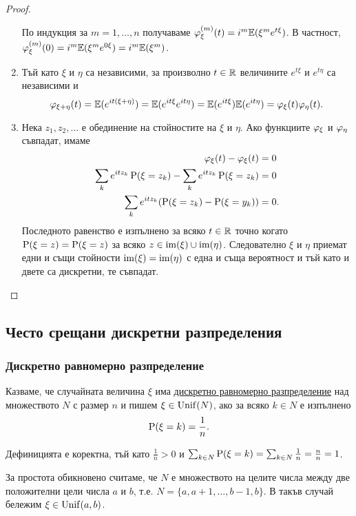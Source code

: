 \documentclass[numbers=endperiod, DIV=15, bibliography=totocnumbered]{scrartcl}
\begin{document}
\begin{proof}
\begin{enumerate}
    По индукция за $m = 1, \ldots, n$ получаваме $\varphi^{(m)}_\xi(t) = i^m \mathbb{E}(\xi^m e^{t \xi})$. В частност, $\varphi^{(m)}_\xi(0) = i^m \mathbb{E}(\xi^m e^{0 \xi}) = i^m \mathbb{E}(\xi^m)$.

    \item Тъй като $\xi$ и $\eta$ са независими, за произволно $t \in \mathbb{R}$ величините $e^{t\xi}$ и $e^{t\eta}$ са независими и
    \begin{displaymath}
      \varphi_{\xi + \eta}(t)
      =
      \mathbb{E}(e^{it(\xi + \eta)})
      =
      \mathbb{E}(e^{it\xi} e^{it\eta})
      =
      \mathbb{E}(e^{it\xi}) \mathbb{E}(e^{it\eta})
      =
      \varphi_\xi(t) \varphi_\eta(t).
    \end{displaymath}

    \item Нека $z_1, z_2, \ldots$ е обединение на стойностите на $\xi$ и $\eta$. Ако функциите $\varphi_\xi$ и $\varphi_\eta$ съвпадат, имаме
    \begin{align*}
      \varphi_\xi(t) - \varphi_\xi(t) &= 0
      \\
      \sum_k e^{i t z_k} \operatorname{P}(\xi = z_k) - \sum_k e^{i t z_k} \operatorname{P}(\xi = z_k) &= 0
      \\
      \sum_k e^{i t z_k} (\operatorname{P}(\xi = z_k) - \operatorname{P}(\xi = y_k)) &= 0.
    \end{align*}
    Последното равенство е изпълнено за всяко $t \in \mathbb{R}$ точно когато $\operatorname{P}(\xi = z) = \operatorname{P}(\xi = z)$ за всяко $z \in \operatorname{im}(\xi) \cup \operatorname{im}(\eta)$. Следователно $\xi$ и $\eta$ приемат едни и същи стойности $\operatorname{im}(\xi) = \operatorname{im}(\eta)$ с една и съща вероятност и тъй като и двете са дискретни, те съвпадат.
  \end{enumerate}
\end{proof}

\subsection{Често срещани дискретни разпределения}

\subsubsection{Дискретно равномерно разпределение}\label{dist:unif}

\begin{definition}
  Казваме, че случайната величина $\xi$ има \uline{дискретно равномерно разпределение} над множеството $N$ с размер $n$ и пишем $\xi \in \operatorname{Unif}(N)$, ако за всяко $k \in N$ е изпълнено
  \begin{displaymath}
    \operatorname{P}(\xi = k) = \frac 1 n.
  \end{displaymath}

  Дефиницията е коректна, тъй като $\frac 1 n > 0$ и $\sum_{k \in N} \operatorname{P}(\xi = k) = \sum_{k \in N} \frac 1 n = \frac n n = 1$.

  За простота обикновено считаме, че $N$ е множеството на целите числа между две положителни цели числа $a$ и $b$, т.е. $N = \{ a, a + 1, \ldots, b - 1, b \}$. В такъв случай бележим $\xi \in \operatorname{Unif}(a, b)$.
\end{definition}
\end{document}
